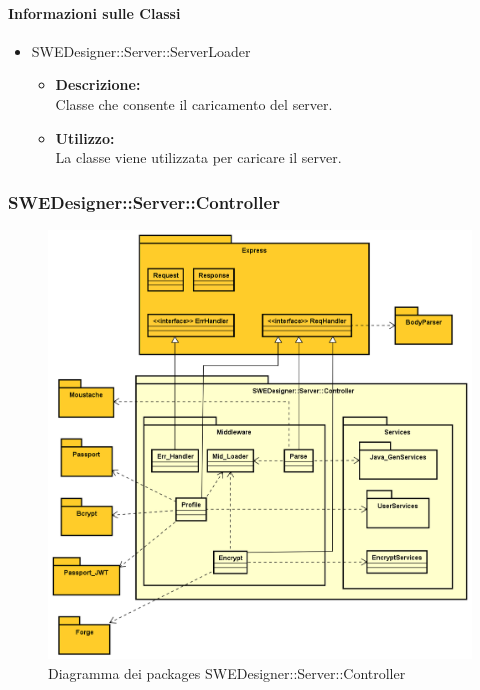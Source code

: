 		\paragraph{Informazioni sulle Classi}
		\begin{itemize}
			\item SWEDesigner::Server::ServerLoader
			\begin{itemize}
				\item \textbf{Descrizione: }\\
				Classe che consente il caricamento del server.
				\item \textbf{Utilizzo: }\\
				La classe viene utilizzata per caricare il server.
			\end{itemize}
		\end{itemize}
		
		\subsubsection{SWEDesigner::Server::Controller}
		 \begin{figure}[h!]
		\centering
		\includegraphics[scale=0.4]{Disegnetti/SWEDesigner__Server__Controller.png}
		\caption{Diagramma dei packages SWEDesigner::Server::Controller}
 		\end{figure}
